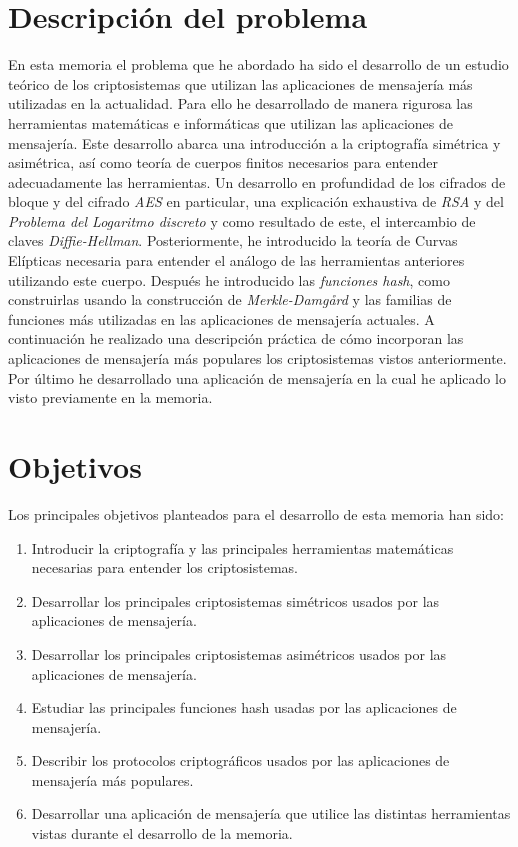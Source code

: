 \section{Descripción del problema}
En esta memoria el problema que he abordado ha sido el desarrollo de un estudio teórico de los criptosistemas que utilizan las aplicaciones de mensajería más utilizadas en la actualidad. Para ello he desarrollado de manera rigurosa las herramientas matemáticas e informáticas que utilizan las aplicaciones de mensajería. Este desarrollo abarca una introducción a la criptografía simétrica y asimétrica, así como teoría de cuerpos finitos necesarios para entender adecuadamente las herramientas.
Un desarrollo en profundidad de los cifrados de bloque y del cifrado \emph{AES} en particular, una explicación exhaustiva de \emph{RSA} y del \emph{Problema del Logaritmo discreto} y como resultado de este, el intercambio de claves \emph{Diffie-Hellman}. Posteriormente, he introducido la teoría de Curvas Elípticas necesaria para entender el análogo de las herramientas anteriores utilizando este cuerpo.
Después he introducido las \emph{funciones hash}, como construirlas usando la construcción de \emph{Merkle-Damgård} y las familias de funciones más utilizadas en las aplicaciones de mensajería actuales. A continuación he realizado una descripción práctica de cómo incorporan las aplicaciones de mensajería más populares los criptosistemas vistos anteriormente. Por último he desarrollado una aplicación de mensajería en la cual he aplicado lo visto previamente en la memoria. 

\section{Objetivos}
Los principales objetivos planteados para el desarrollo de esta memoria han sido:
\begin{enumerate}
	\item Introducir la criptografía y las principales herramientas matemáticas necesarias para entender los criptosistemas. 
	\item Desarrollar los principales criptosistemas simétricos usados por las aplicaciones de mensajería.
	\item Desarrollar los principales criptosistemas asimétricos usados por las aplicaciones de mensajería.
	\item Estudiar las principales funciones hash usadas por las aplicaciones de mensajería.
	\item Describir los protocolos criptográficos usados por las aplicaciones de mensajería más populares.
	\item Desarrollar una aplicación de mensajería que utilice las distintas herramientas vistas durante el desarrollo de la memoria.
\end{enumerate}

